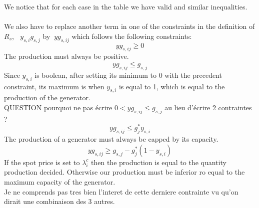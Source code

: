 \documentclass[letterpaper]{article}
\begin{document}
We notice that for each case in the table we have valid and similar inequalities.\\\\
We also have to replace another term in one of the constraints in the definition of $R_s$, $\ $ $y_{s,i}g_{s,j}$ by $ \ yg_{s,ij}$ which follows the following constraints:\\
\begin{equation}
yg_{s,ij} \ge 0
\end{equation}
The production must always be positive.
\begin{equation}
yg_{s,ij} \le g_{s,j}
\end{equation}
Since $y_{s,i}$ is boolean, after setting its minimum to 0 with the precedent constraint, its maximum is when $y_{s,i}$ is equal to 1, which is equal to the production of the generator.\\
QUESTION pourquoi ne pas \'ecrire $0 < yg_{s,ij} \le g_{s,j}$ au lieu d'\'ecrire 2 contraintes ?
\begin{equation}
yg_{s,ij} \le g^*_j y_{s,i}
\end{equation}
The production  of a generator must always be capped by its capacity.
\begin{equation}
yg_{s,ij} \ge g_{s,j} - g^*_j (1 - y_{s,i})
\end{equation}
If the spot price is set to $\lambda_i^c$ then the production is equal to the quantity production decided. Otherwise our production must be inferior ro equal to the maximum capacity of the generator.\\
Je ne comprends pas tres bien l'interet de cette derniere contrainte vu qu'on dirait une combinaison des 3 autres.
\end{document}
